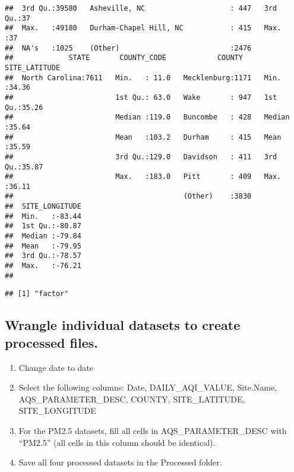 \documentclass[]{article}
\newenvironment{Shaded}{\begin{snugshade}}{\end{snugshade}}
\newcommand{\KeywordTok}[1]{\textcolor[rgb]{0.13,0.29,0.53}{\textbf{#1}}}
\newcommand{\DecValTok}[1]{\textcolor[rgb]{0.00,0.00,0.81}{#1}}
\newcommand{\OperatorTok}[1]{\textcolor[rgb]{0.81,0.36,0.00}{\textbf{#1}}}
\newcommand{\NormalTok}[1]{#1}
\providecommand{\tightlist}{%
  \setlength{\itemsep}{0pt}\setlength{\parskip}{0pt}}
\begin{document}
\begin{verbatim}
##  3rd Qu.:39580   Asheville, NC                    : 447   3rd Qu.:37  
##  Max.   :49180   Durham-Chapel Hill, NC           : 415   Max.   :37  
##  NA's   :1025    (Other)                          :2476               
##             STATE       COUNTY_CODE            COUNTY     SITE_LATITUDE  
##  North Carolina:7611   Min.   : 11.0   Mecklenburg:1171   Min.   :34.36  
##                        1st Qu.: 63.0   Wake       : 947   1st Qu.:35.26  
##                        Median :119.0   Buncombe   : 428   Median :35.64  
##                        Mean   :103.2   Durham     : 415   Mean   :35.59  
##                        3rd Qu.:129.0   Davidson   : 411   3rd Qu.:35.87  
##                        Max.   :183.0   Pitt       : 409   Max.   :36.11  
##                                        (Other)    :3830                  
##  SITE_LONGITUDE  
##  Min.   :-83.44  
##  1st Qu.:-80.87  
##  Median :-79.84  
##  Mean   :-79.95  
##  3rd Qu.:-78.57  
##  Max.   :-76.21  
## 
\end{verbatim}

\begin{Shaded}
\end{Shaded}

\begin{verbatim}
## [1] "factor"
\end{verbatim}

\subsection{Wrangle individual datasets to create processed
files.}\label{wrangle-individual-datasets-to-create-processed-files.}

\begin{enumerate}
\def\labelenumi{\arabic{enumi}.}
\setcounter{enumi}{2}
\tightlist
\item
  Change date to date
\item
  Select the following columns: Date, DAILY\_AQI\_VALUE, Site.Name,
  AQS\_PARAMETER\_DESC, COUNTY, SITE\_LATITUDE, SITE\_LONGITUDE
\item
  For the PM2.5 datasets, fill all cells in AQS\_PARAMETER\_DESC with
  ``PM2.5'' (all cells in this column should be identical).
\item
  Save all four processed datasets in the Processed folder.
\end{enumerate}
\end{document}
